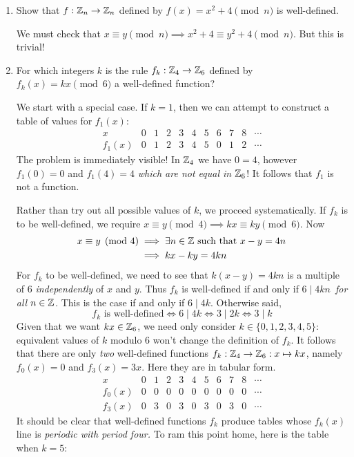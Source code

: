 \begin{examples}{}{}
\begin{enumerate}
	\item Show that $f:\mathbb{Z}_n\to\mathbb{Z}_n$ defined by $f(x)=x^2+4\pmod n$ is well-defined.\par
	We must check that $x\equiv y\pmod n\implies x^2+4\equiv y^2+4\pmod n$. But this is trivial!
	\item For which integers $k$ is the rule $f_k:\mathbb{Z}_4\to\mathbb{Z}_6$ defined by $f_k(x)=kx\pmod 6$ a well-defined function?\par
	We start with a special case. If $k=1$, then we can attempt to construct a table of values for $f_1(x)$:
	\[
		\begin{array}{c|cccc|cccc|cc}
			x&0&1&2&3&4&5&6&7&8&\cdots\\\hline
			f_1(x)&0&1&2&3&4&5&0&1&2&\cdots
		\end{array}
	\]
	The problem is immediately visible! In $\mathbb{Z}_4$ we have $0=4$, however $f_1(0)=0$ and $f_1(4)=4$ \emph{which are not equal in $\mathbb{Z}_6$}! It follows that $f_1$ is not a function.\par
	Rather than try out all possible values of $k$, we proceed systematically. If $f_k$ is to be well-defined, we require $x\equiv y\pmod 4\implies kx\equiv ky\pmod 6$. Now
	\begin{align*}
		x\equiv y\pmod 4&\implies \exists n\in\mathbb{Z}\text{ such that }x-y=4n\\*
		&\implies kx-ky=4kn
	\end{align*}
	For $f_k$ to be well-defined, we need to see that $k(x-y)=4kn$ is a multiple of 6 \emph{independently} of $x$ and $y$. Thus $f_k$ is well-defined if and only if $6\mid 4kn$\, \emph{for all} $n\in\mathbb{Z}$. This is the case if and only if $6\mid 4k$. Otherwise said,
	\[
		\text{$f_k$ is well-defined}\iff 6\mid 4k\iff 3\mid 2k\iff 3\mid k
	\]
	Given that we want $kx\in\mathbb{Z}_6$, we need only consider $k\in\{0,1,2,3,4,5\}$: equivalent values of $k$ modulo 6 won't change the definition of $f_k$. It follows that there are only \emph{two} well-defined functions $f_k:\mathbb{Z}_4\to\mathbb{Z}_6:x\mapsto kx$, namely $f_0(x)=0$ and $f_3(x)=3x$. Here they are in tabular form.
	\[
		\begin{array}{c|cccc|cccc|cc}
			x&0&1&2&3&4&5&6&7&8&\cdots\\\hline
			f_0(x)&0&0&0&0&0&0&0&0&0&\cdots\\\hline
			f_3(x)&0&3&0&3&0&3&0&3&0&\cdots
		\end{array}
	\]
	It should be clear that well-defined functions $f_k$ produce tables whose $f_k(x)$ line is \emph{periodic with period four.} To ram this point home, here is the table when $k=5$:

\end{enumerate}
\end{examples}
